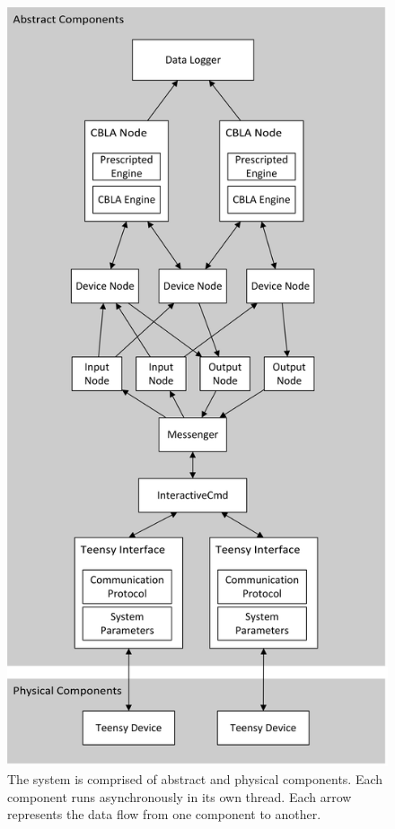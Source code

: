 \begin{figure} [!htbp]
	\centering
	\includegraphics[height=0.90 \textheight]{"fig/interactive control system/high-level system architecture"}
	\caption[High-level system architecture]{The system is comprised of abstract and physical components. Each component runs asynchronously in its own thread. Each arrow represents the data flow from one component to another.}
	\label{fig:system-architecture}
\end{figure}

